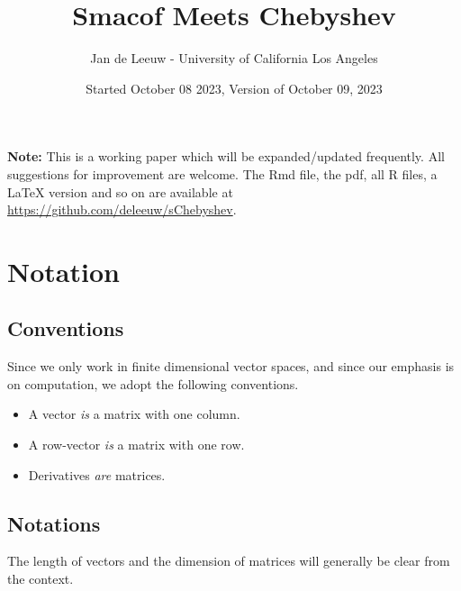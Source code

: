 \documentclass[
  12pt,
]{article}
\title{Smacof Meets Chebyshev}
\author{Jan de Leeuw - University of California Los Angeles}
\date{Started October 08 2023, Version of October 09, 2023}
\providecommand{\tightlist}{%
  \setlength{\itemsep}{0pt}\setlength{\parskip}{0pt}}
\begin{document}
\maketitle

{
\setcounter{tocdepth}{4}
\tableofcontents
}
\textbf{Note:} This is a working paper which will be expanded/updated frequently. All suggestions for improvement are welcome. The Rmd file, the pdf, all R files, a LaTeX version and so on are available at \url{https://github.com/deleeuw/sChebyshev}.

\section*{Notation}\label{notation}

\subsection*{Conventions}\label{conventions}

Since we only work in finite dimensional vector spaces, and since our emphasis is on computation, we adopt the following conventions.

\begin{itemize}
\tightlist
\item
  A vector \emph{is} a matrix with one column.
\item
  A row-vector \emph{is} a matrix with one row.
\item
  Derivatives \emph{are} matrices.
\end{itemize}

\subsection*{Notations}\label{notations}

The length of vectors and the dimension of matrices will generally
be clear from the context.
\end{document}
